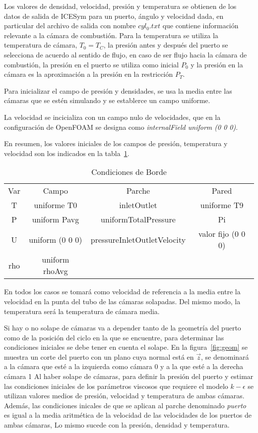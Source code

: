 Los valores de densidad, velocidad, presión y temperatura se obtienen de los
datos de salida de ICESym para un puerto, ángulo y velocidad dada, en
particular del archivo de salida con nombre \emph{$cyl_0.txt$} que contiene
información relevante a la cámara de combustión.
%
Para la temperatura se utiliza la temperatura de cámara, $T_0 = T_C$, la
presión antes y después del puerto se selecciona de acuerdo al sentido de
flujo, en caso de ser flujo hacia la cámara de combustión, la presión en el
puerto se utiliza como inicial $P_0$ y la presión en la cámara es la
aproximación a la presión en la restricción $P_T$.

Para inicializar el campo de presión y densidades, se usa la media entre las
cámaras que se estén simulando y se establerce un campo uniforme.

La velocidad se incicializa con un campo nulo de velocidades, que en la
configuración de OpenFOAM se designa como \emph{internalField uniform (0 0 0)}.

En resumen, los valores iniciales de los campos de presión, temperatura y velocidad
son los indicados en la tabla~\ref{tab:cc}.

\begin{table}
\centering
    \begin{tabular}{cccc} \toprule
        Var & Campo         & Parche                      & Pared \\
        T   & uniforme T0   & inletOutlet                 & uniforme T9\\ \midrule
        P   & uniform Pavg  & uniformTotalPressure        & Pi \\
        U   & uniform (0 0 0) & pressureInletOutletVelocity & valor fijo (0 0 0)\\
        rho & uniform rhoAvg \\ \bottomrule
    \end{tabular}
    \caption{Condiciones de Borde}\label{tab:cc}
\end{table}

En todos los casos se tomará como velocidad de referencia a la media entre la
velocidad en la punta del tubo de las cámaras solapadas.
%
Del mismo modo, la temperatura será la temperatura de cámara media.

Si hay o no solape de cámaras va a depender tanto de la geometría del puerto
como de la posición del ciclo en la que se encuentre, para determinar las
condiciones iniciales se debe tener en cuenta el solape.
%
En la figura~\ref{fig:geom} se muestra un corte del puerto con un plano cuya
normal está en $\vec{z}$, se denominará a la cámara que esté a la izquierda
como cámara 0 y a la que esté a la derecha cámara 1
%
Al haber solape de cámaras, para definir la presión del puerto y estimar las
condiciones iniciales de los parámetros viscosos que requiere el modelo
$k-\epsilon$ se utilizan valores medios de presión, velocidad y temperatura de
ambas cámaras.
%
Además, las condiciones inicales de que se aplican al parche denominado
\emph{puerto} es igual a la media aritmética de la velocidad de las velocidades
de los puertos de ambas cámaras, Lo mismo sucede con la presión, densidad y
temperatura.

